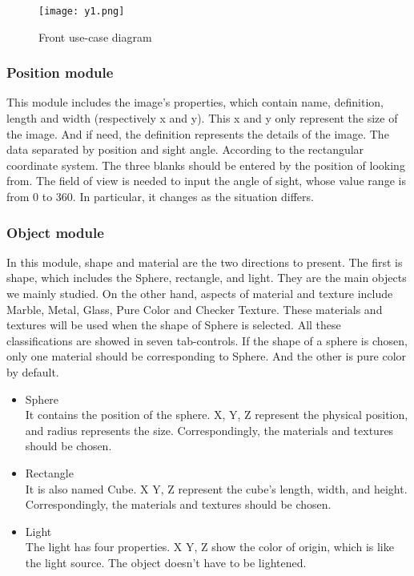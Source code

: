 \documentclass[11pt]{article}
\begin{document}
\begin{figure}[H]

\centering
\texttt{[image: y1.png]}
\caption{Front use-case diagram}
\label{fig:label}
\end{figure}

\subsubsection{Position module}
This module includes the image's properties, which contain name, definition, length and width (respectively x and y). This x and y only represent the size of the image.  And if need, the definition represents the details of the image. The data separated by position and sight angle. According to the rectangular coordinate system. The three blanks should be entered by the position of looking from. The field of view is needed to input the angle of sight, whose value range is from 0 to 360. In particular, it changes as the situation differs.
\subsubsection{Object module}
In this module, shape and material are the two directions to present. The first is shape, which includes the Sphere, rectangle, and light. They are the main objects we mainly studied. On the other hand, aspects of material and texture include Marble, Metal, Glass, Pure Color and Checker Texture. These materials and textures will be used when the shape of Sphere is selected. All these classifications are showed in seven tab-controls. If the shape of a sphere is chosen, only one material should be corresponding to Sphere. And the other is pure color by default.

\begin{itemize}
\item
Sphere\\
It contains the position of the sphere. X, Y, Z represent the physical position, and radius represents the size. Correspondingly, the materials and textures should be chosen.
\item
Rectangle\\
It is also named Cube. X Y, Z represent the cube's length, width, and height. Correspondingly, the materials and textures should be chosen.
\item
Light\\
The light has four properties. X Y, Z show the color of origin, which is like the light source. The object doesn’t have to be lightened.
\end{itemize}
\end{document}
